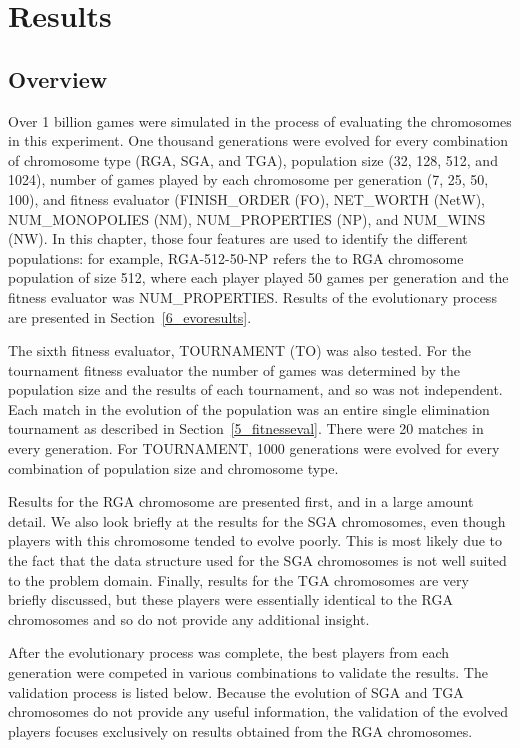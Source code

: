 \clearpage
\chapter{Results}\label{chap:results}

\section{Overview}

Over 1 billion games were simulated in the process of evaluating the chromosomes
in this experiment. One thousand generations were evolved for every combination
of chromosome type (RGA, SGA, and TGA), population size (32, 128, 512, and
1024), number of games played by each chromosome per generation (7, 25, 50,
100), and fitness evaluator (FINISH\_ORDER (FO), NET\_WORTH (NetW),
NUM\_MONOPOLIES (NM), NUM\_PROPERTIES (NP), and NUM\_WINS (NW). In this chapter,
those four features are used to identify the different populations: for example,
RGA-512-50-NP refers the to RGA chromosome population of size 512, where each
player played 50 games per generation and the fitness evaluator was
NUM\_PROPERTIES. Results of the evolutionary process are presented in
Section~\ref{6_evoresults}.

The sixth fitness evaluator, TOURNAMENT (TO) was also tested. For the tournament
fitness evaluator the number of games was determined by the population size and
the results of each tournament, and so was not independent. Each match in the
evolution of the population was an entire single elimination tournament as
described in Section~\ref{5_fitnesseval}. There were 20 matches in every
generation. For TOURNAMENT, 1000 generations were evolved for every combination
of population size and chromosome type.

Results for the RGA chromosome are presented first, and in a large amount
detail. We also look briefly at the results for the SGA chromosomes, even though
players with this chromosome tended to evolve poorly. This is most likely due to
the fact that the data structure used for the SGA chromosomes is not well suited
to the problem domain. Finally, results for the TGA chromosomes are very briefly
discussed, but these players were essentially identical to the RGA chromosomes
and so do not provide any additional insight.

After the evolutionary process was complete, the best players from each
generation were competed in various combinations to validate the results. The
validation process is listed below. Because the evolution of SGA and TGA
chromosomes do not provide any useful information, the validation of the evolved
players focuses exclusively on results obtained from the RGA chromosomes.

